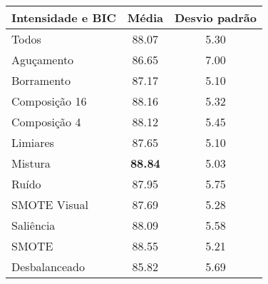 \begin{itemize}
\begin{table}[]
\centering
\caption{}
\label{fig:resultados:1:tabvis}
\begin{tabular}{|l|c|c|}
\hline
\textbf{Intensidade e BIC} & \textbf{Média} & \textbf{Desvio padrão} \\ \hline
Todos                      & 88.07          & 5.30                   \\ \hline
Aguçamento                 & 86.65          & 7.00                   \\ \hline
Borramento                 & 87.17          & 5.10                   \\ \hline
Composição 16              & 88.16          & 5.32                   \\ \hline
Composição 4               & 88.12          & 5.45                   \\ \hline
Limiares                   & 87.65          & 5.10                   \\ \hline
Mistura                    & \textbf{88.84} & 5.03          \\ \hline
Ruído                      & 87.95          & 5.75                   \\ \hline
SMOTE Visual               & 87.69          & 5.28                   \\ \hline
Saliência                  & 88.09          & 5.58                   \\ \hline
SMOTE                      & 88.55          & 5.21                   \\ \hline
Desbalanceado              & 85.82          & 5.69                   \\ \hline
\end{tabular}
\end{table}



\end{itemize}
